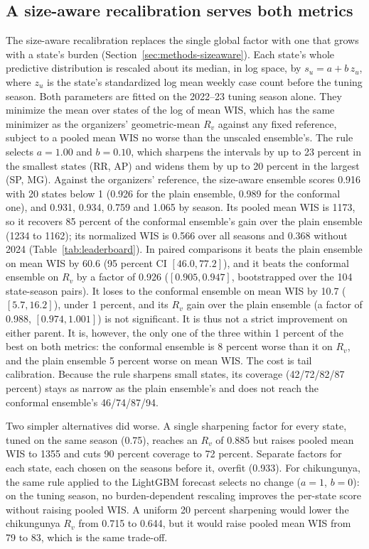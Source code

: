 \documentclass[11pt]{article}
\begin{document}
\subsection{A size-aware recalibration serves both metrics}\label{sec:sizeaware}
The size-aware recalibration replaces the single global factor with one that grows with a state's
burden (Section~\ref{sec:methods-sizeaware}). Each state's whole predictive distribution is rescaled
about its median, in log space, by $s_u=a+b\,z_u$, where $z_u$ is the state's standardized log mean
weekly case count before the tuning season. Both parameters are fitted on the 2022--23 tuning season
alone. They minimize the mean over states of the log of mean WIS, which has the same minimizer as
the organizers' geometric-mean $R_v$ against any fixed reference, subject to a pooled mean WIS no
worse than the unscaled ensemble's. The rule selects $a=1.00$ and $b=0.10$, which sharpens the
intervals by up to 23 percent in the smallest states (RR, AP) and widens them by up to 20 percent
in the largest (SP, MG). Against the organizers' reference, the size-aware ensemble scores 0.916
with 20 states below 1 (0.926 for the plain ensemble, 0.989 for the conformal one), and 0.931,
0.934, 0.759 and 1.065 by season. Its pooled mean WIS is 1173, so it recovers 85 percent of the
conformal ensemble's gain over the plain ensemble (1234 to 1162); its normalized WIS is 0.566 over
all seasons and 0.368 without 2024 (Table~\ref{tab:leaderboard}). In paired comparisons it beats
the plain ensemble on mean WIS by 60.6 (95 percent CI $[46.0, 77.2]$), and it beats the conformal
ensemble on $R_v$ by a factor of 0.926 ($[0.905, 0.947]$, bootstrapped over the 104 state-season
pairs). It loses to the conformal ensemble on mean WIS by 10.7 ($[5.7, 16.2]$), under 1 percent,
and its $R_v$ gain over the plain ensemble (a factor of 0.988, $[0.974, 1.001]$) is not
significant. It is thus not a strict improvement on either parent. It is, however, the only one of
the three within 1 percent of the best on both metrics: the conformal ensemble is 8 percent worse
than it on $R_v$, and the plain ensemble 5 percent worse on mean WIS. The cost is tail calibration.
Because the rule sharpens small states, its coverage (42/72/82/87 percent) stays as narrow as the
plain ensemble's and does not reach the conformal ensemble's 46/74/87/94.

Two simpler alternatives did worse. A single sharpening factor for every state, tuned on the same
season (0.75), reaches an $R_v$ of 0.885 but raises pooled mean WIS to 1355 and cuts 90 percent
coverage to 72 percent. Separate factors for each state, each chosen on the seasons before it,
overfit (0.933). For chikungunya, the same rule applied to the LightGBM forecast selects no change
($a=1$, $b=0$): on the tuning season, no burden-dependent rescaling improves the per-state score
without raising pooled WIS. A uniform 20 percent sharpening would lower the chikungunya $R_v$ from
0.715 to 0.644, but it would raise pooled mean WIS from 79 to 83, which is the same trade-off.
\end{document}
